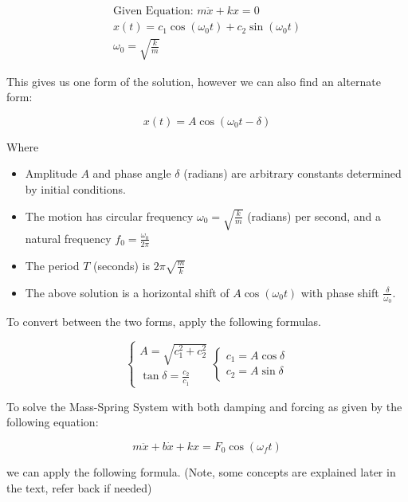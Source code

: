             \[ \begin{aligned}
                \text{Given Equation: } m \ddot{x} + kx = 0\\
                x(t) = c_1 \cos \left( \omega_0 t \right) + c_2 \sin \left( \omega_0 t \right)\\
                \omega_0 = \sqrt{\frac{k}{m} }
            \end{aligned} \]

        This gives us one form of the solution, however we can also find an alternate form:

            \[ x(t) = A \cos \left( \omega_0 t - \delta \right) \]

        Where
            \begin{itemize}
                \item Amplitude $A$ and phase angle $\delta$ (radians) are arbitrary constants determined by initial conditions.
                \item The motion has circular frequency $\omega_0 = \sqrt{\frac{k}{m} }$ (radians) per second, and a natural frequency $f_0 = \frac{\omega_0}{2 \pi}$
                \item The period $T$ (seconds) is $2 \pi \sqrt{\frac{m}{k} }$
                \item The above solution is a horizontal shift of $A \cos (\omega_0 t)$ with phase shift $\frac{\delta}{\omega_0}$.
            \end{itemize}

        To convert between the two forms, apply the following formulas.

            \[
                \begin{cases}
                    A = \sqrt{c_1^2 + c_2^2}\\
                    \tan \delta = \frac{c_2}{c_1}
                \end{cases}
                \begin{cases}
                    c_1 = A \cos \delta\\
                    c_2 = A \sin \delta
                \end{cases}
            \]

        To solve the Mass-Spring System with both damping and forcing as given by the following equation:

            \[
                m \ddot{x} + b\dot{x} + kx = F_0 \cos ( \omega_f t )
            \]

        we can apply the following formula. (Note, some concepts are explained later in the text, refer back if needed)

